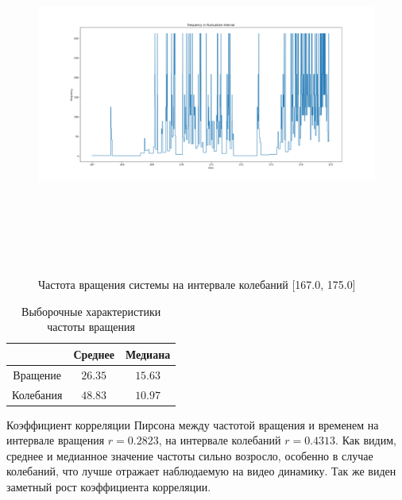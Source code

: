 \documentclass[a4paper,12pt]{article} %
\begin{document}
	\begin{figure}[H]
		
		\includegraphics[width = 18cm, height = 12cm]{Fluct_dropped.png}
		\caption{Частота вращения системы на интервале колебаний [167.0, 175.0]}
		\label{fig:fluct_dropped}
	\end{figure}

	\begin{table}[H]
		\caption{Выборочные характеристики частоты вращения}
		\label{tab:my_label3}
		\begin{center}
			\vspace{5mm}
			\begin{tabular}{|c|c|c|}
				\hline
				& Среднее & Медиана\\
				\hline
				Вращение & $ 26.35 $ & $ 15.63 $\\
				\hline
				Колебания & $ 48.83 $ & $ 10.97 $\\
				\hline
			\end{tabular}
		\end{center}
	\end{table}

	Коэффициент корреляции Пирсона между частотой вращения и временем на интервале вращения $r = 0.2823$, на интервале колебаний $r = 0.4313$.
	\newline Как видим, среднее и медианное значение частоты сильно возросло, особенно в случае колебаний, что лучше отражает наблюдаемую на видео динамику. Так же виден заметный рост коэффициента корреляции.
	
\end{document}

